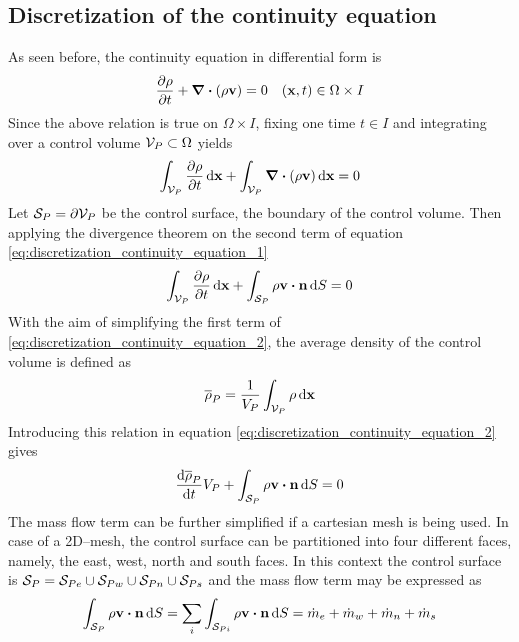 
\subsection{Discretization of the continuity equation}

As seen before, the continuity equation in differential form is
\begin{equation}
	\pdv{\rho}{t} + \div(\rho \vb{v}) = 0 \quad (\vb{x},t) \in \Omega \times I
\end{equation}
Since the above relation is true on $\Omega \times I$, fixing one time $t \in I$ and integrating over a control volume $\mathcal{V}_{P} \subset \Omega$ yields
\begin{equation} \label{eq:discretization_continuity_equation_1}
	\int_{\mathcal{V}_{P}} \pdv{\rho}{t} \dd{\vb{x}} + \int_{\mathcal{V}_{P}} \div(\rho \vb{v}) \dd{\vb{x}} = 0
\end{equation}
Let $\mathcal{S}_{P} = \partial \mathcal{V}_{P}$ be the control surface, \ie the boundary of the control volume. Then applying the divergence theorem on the second term of equation \eqref{eq:discretization_continuity_equation_1}
\begin{equation} \label{eq:discretization_continuity_equation_2}
	\int_{\cv{P}} \pdv{\rho}{t} \dd{\vb{x}} + 
	\int_{\cs{P}} \rho \vb{v} \vdot \vb{n} \dd{S} = 0
\end{equation}
With the aim of simplifying the first term of \eqref{eq:discretization_continuity_equation_2}, the average density of the control volume is defined as
\begin{equation}
	\overline{\rho}_P = \frac{1}{V_P} \int_{\mathcal{V}_{P}} \rho \dd{\vb{x}}
\end{equation}
Introducing this relation in equation \eqref{eq:discretization_continuity_equation_2} gives
\begin{equation} \label{eq:discretization_continuity_equation_3}
	\frac{\dd \overline{\rho}_P}{\dd{t}} V_P + 
	\int_{\cs{P}} \rho \vb{v} \vdot \vb{n} \dd{S} = 0
\end{equation}
The mass flow term can be further simplified if a cartesian mesh is being used. In case of a 2D--mesh, the control surface can be partitioned into four different faces, namely, the east, west, north and south faces. In this context the control surface is $\mathcal{S}_{P} = \mathcal{S}_{Pe} \cup \mathcal{S}_{Pw} \cup \mathcal{S}_{Pn} \cup \mathcal{S}_{Ps}$ and the mass flow term may be expressed as
\begin{equation}
	\int_{\cs{P}} \rho \vb{v} \vdot \vb{n} \dd{S} = 
	\sum_{i} \int_{\cs{Pi}} \rho \vb{v} \vdot \vb{n} \dd{S} = 
	\dot{m}_e + \dot{m}_w + \dot{m}_n + \dot{m}_s
\end{equation}
